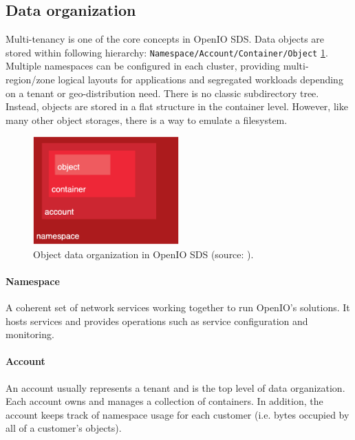     \subsection{Data organization}
    Multi-tenancy is one of the core concepts in OpenIO SDS. Data objects are stored within following hierarchy: \texttt{Namespace/Account/Container/Object} \ref{fig:oioDataOrganization}. Multiple namespaces can be configured in each cluster, providing multi-region/zone logical layouts for applications and segregated workloads depending on a tenant or geo-distribution need\cite{oioSdsConcepts}.
    There is no classic subdirectory tree. Instead, objects are stored in a flat structure in the container level. However, like many other object storages, there is a way to emulate a filesystem.

    \begin{figure}[H]
        \centering
        \includegraphics[width=0.5\textwidth]{obrazky-figures/openio-data-organization.eps}
        \caption{Object data organization in OpenIO SDS (source: \cite{oioCoreSolution}).}
        \label{fig:oioDataOrganization}
    \end{figure}

    \paragraph{Namespace}
    A coherent set of network services working together to run OpenIO's solutions. It hosts services and provides operations such as service configuration and monitoring.

    \paragraph{Account}
    An account usually represents a tenant and is the top level of data organization. Each account owns and manages a collection of containers. In addition, the account keeps track of namespace usage for each customer (i.e. bytes occupied by all of a customer's objects)\cite{oioCoreSolution}.

